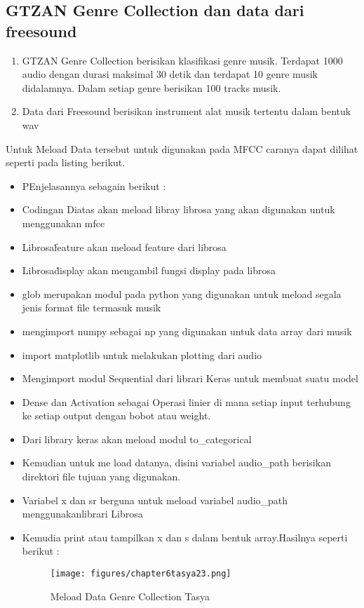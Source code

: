 \subsection{GTZAN Genre Collection dan data dari freesound}
\begin{enumerate}
\item GTZAN Genre Collection berisikan klasifikasi genre musik. Terdapat 1000 audio dengan durasi maksimal 30 detik dan terdapat 10 genre musik didalamnya. Dalam setiap genre berisikan 100 tracks musik.
\item Data dari Freesound berisikan instrument alat musik tertentu dalam bentuk wav
\end{enumerate}
Untuk Meload Data tersebut untuk digunakan pada MFCC caranya dapat dilihat seperti pada listing berikut.

\begin{itemize}
\item PEnjelasannya sebagain berikut :
\item Codingan Diatas akan meload libray librosa yang akan digunakan untuk menggunakan mfcc
\item Librosa\.feature akan meload feature dari librosa
\item Librosa\.display akan mengambil fungsi display pada librosa
\item glob merupakan modul pada python yang digunakan untuk meload segala jenis format file termasuk musik
\item mengimport numpy sebagai np yang digunakan untuk data array dari musik
\item import matplotlib untuk melakukan plotting dari audio
\item Mengimport modul Sequential dari librari Keras untuk membuat suatu model
\item Dense dan Activation sebagai Operasi linier di mana setiap input terhubung ke setiap output dengan bobot atau weight.
\item Dari library keras akan meload modul to\_categorical
\item Kemudian untuk me load datanya, disini variabel audio\_path berisikan direktori file tujuan yang digunakan.
\item Variabel x dan sr berguna untuk meload variabel audio\_path menggunakanlibrari Librosa
\item Kemudia print atau tampilkan x dan s dalam bentuk array.Hasilnya seperti berikut :
\begin{figure}[ht]
\centering
\texttt{[image: figures/chapter6tasya23.png]}
\caption{Meload Data Genre Collection Tasya}
\label{Praktek}
\end{figure}
\end{itemize}


